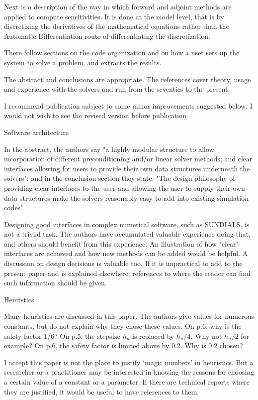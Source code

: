 Next is a description of the way in which forward and adjoint methods
are applied to compute sensitivities. It is done at the model level,
that is by discretizing the derivatives of the mathematical equations
rather than the Automatic Differentiation route of differentiating the
discretization.

There follow sections on the code organization and on how a user sets
up the system to solve a problem, and extracts the results. 

The abstract and conclusions are appropriate. The references cover
theory, usage and experience with the solvers and run from the
seventies to the present.  

I recommend publication subject to some minor improvements suggested
below.  I would not wish to see the revised version before publication.


Software architecture 

In the abstract, the authors say "a highly modular structure to allow
incorporation of different preconditioning and/or linear solver
methods; and clear interfaces allowing for users to provide their own
data structures underneath the solvers"; and in the conclusion section
they state: "The design philosophy of providing clear interfaces to
the user and allowing the user to supply their own data structures
make the solvers reasonably easy to add into existing simulation
codes".

Designing good interfaces in complex numerical software, such as
SUNDIALS, is not a trivial task. The authors have accumulated valuable
experience doing that, and others should benefit from this
experience. An illustration of how "clear" interfaces are achieved and
how new methods can be added would be helpful.  A discussion on design
decisions is valuable too. If it is impractical to add to the present
paper and is explained elsewhere, references to where the reader can
find such information should be given.


Heuristics 

Many heuristics are discussed in this paper. The authors give values
for numerous constants, but do not explain why they chose these
values.  On p.6, why is the safety factor 1/6? On p.5, the stepsize
$h_n$ is replaced by $h_n/4$. Why not $h_n/2$ for example? On p.6, the
safety factor is limited above by 0.2. Why is 0.2 chosen? 

I accept this paper is not the place to justify `magic numbers' in
heuristics. But a researcher or a practitioner may be interested in
knowing the reasons for choosing a certain value of a constant or a
parameter. If there are technical reports where they are justified, it
would be useful to have references to them. 

